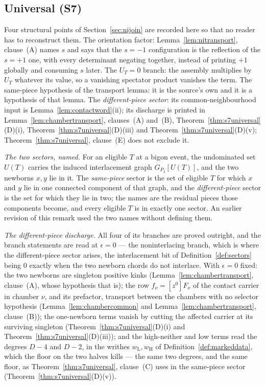 \subsection{Universal (S7)}\label{sec:s7universal}


\begin{remark}\label{rem:nistatus}
Four structural points of Section~\ref{sec:nijoin} are recorded here so that
no reader has to reconstruct them. The orientation factor:
Lemma~\ref{lem:nitransport}, clause~(A) names $s$
and says that the $s=-1$ configuration is the reflection of the $s=+1$ one,
with every determinant negating together, instead of printing $+1$ globally and
consuming $s$ later. The $U_T=0$ branch: the assembly multiplies by $U_T$
whatever its value, so a vanishing spectator product vanishes the term. The
same-piece hypothesis of the transport lemma: it is the source's own and it is
a hypothesis of that lemma. The
\emph{different-piece sector}: its common-neighbourhood input is
Lemma~\ref{lem:contactword}(ii); its discharge is printed in
Lemma~\ref{lem:chambertransport}, clauses~(A) and~(B),
Theorem~\ref{thm:s7universal}(D)(i), Theorem~\ref{thm:s7universal}(D)(iii) and
Theorem~\ref{thm:s7universal}(D)(v); Theorem~\ref{thm:s7universal}, clause~(E) does not exclude it.

\emph{The two sectors, named.} For an eligible $T$ at a bigon event, the
undominated set $U(T)$ carries the induced interlacement graph
$G_{P_2}[U(T)]$, and the two newborns $x,y$ lie in it. The \emph{same-piece}
sector is the set of eligible $T$ for which $x$ and $y$ lie in one connected
component of that graph, and the \emph{different-piece} sector is the set for
which they lie in two; the names are the residual pieces those components
become, and every eligible $T$ is in exactly one sector. An earlier revision of
this remark used the two names without defining them.

\emph{The different-piece discharge.} All four of its branches are proved outright, and
the branch statements are read at $\epsilon=0$ --- the noninterlacing branch,
which is where the different-piece sector arises, the interlacement bit of
Definition~\ref{def:sectors} being $0$ exactly when the two newborn chords do
not interlace. With $\epsilon=0$ fixed: the two newborns are singleton positive
kinks (Lemma~\ref{lem:chambertransport}, clause~(A), whose hypothesis that is); the row
$f_\nu=[z^0]F_\nu$ of the contact carrier in chamber $\nu$, and its prefactor,
transport between the chambers with no selector hypothesis
(Lemma~\ref{lem:chambercommon} and Lemma~\ref{lem:chambertransport}, clause~(B)); the
one-newborn terms vanish by cutting the affected carrier at its surviving
singleton (Theorem~\ref{thm:s7universal}(D)(i) and Theorem~\ref{thm:s7universal}(D)(iii)); and the
high-neither and low terms read the degrees $D-4$ and $D-2$, in the writhes
$w_{\mathrm L},w_{\mathrm H}$ of Definition~\ref{def:markeddata}, which the
floor on the two halves kills --- the same two degrees, and the same floor, as
Theorem~\ref{thm:s7universal}, clause~(C) uses in the same-piece sector
(Theorem~\ref{thm:s7universal}(D)(v)).
\end{remark}

